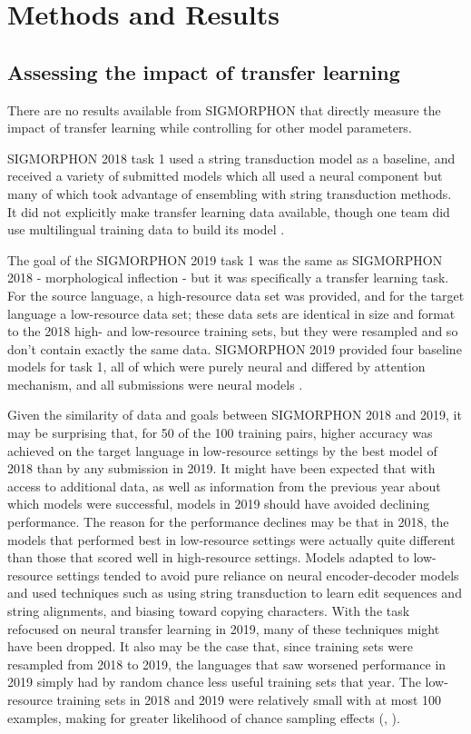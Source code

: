 \chapter{Methods and Results}

\section{Assessing the impact of transfer learning}

There are no results available from SIGMORPHON that directly measure the impact of transfer learning while controlling for other model parameters. 

SIGMORPHON 2018 task 1 used a string transduction model as a baseline, and received a variety of submitted models which all used a neural component but many of which took advantage of ensembling with string transduction methods. It did not explicitly make transfer learning data available, though one team did use multilingual training data to build its model \parencite{Cotterell2018b}.

The goal of the SIGMORPHON 2019 task 1 was the same as SIGMORPHON 2018 - morphological inflection - but it was specifically a transfer learning task. For the source language, a high-resource data set was provided, and for the target language a low-resource data set; these data sets are identical in size and format to the 2018 high- and low-resource training sets, but they were resampled and so don't contain exactly the same data. SIGMORPHON 2019 provided four baseline models for task 1, all of which were purely neural and differed by attention mechanism, and all submissions were neural models \parencite{McCarthy2019}. 

Given the similarity of data and goals between SIGMORPHON 2018 and 2019, it may be surprising that, for 50 of the 100 training pairs, higher accuracy was achieved on the target language in low-resource settings by the best model of 2018 than by any submission in 2019. It might have been expected that with access to additional data, as well as information from the previous year about which models were successful, models in 2019 should have avoided declining performance. The reason for the performance declines may be that in 2018, the models that performed best in low-resource settings were actually quite different than those that scored well in high-resource settings. Models adapted to low-resource settings tended to avoid pure reliance on neural encoder-decoder models and used techniques such as using string transduction to learn edit sequences and string alignments, and biasing toward copying characters. With the task refocused on neural transfer learning in 2019, many of these techniques might have been dropped. It also may be the case that, since training sets were resampled from 2018 to 2019, the languages that saw worsened performance in 2019 simply had by random chance less useful training sets that year. The low-resource training sets in 2018 and 2019 were relatively small with at most 100 examples, making for greater likelihood of chance sampling effects (\cite{McCarthy2019}, \cite{Cotterell2018b}).

